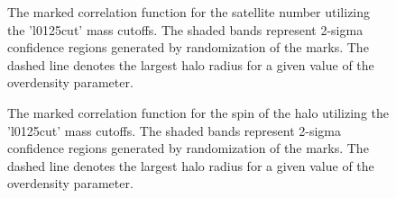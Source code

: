 \documentclass[usenatbib,usegraphicx,letterpaper]{mn2e}
\begin{document}
\begin{figure}
	\centering
	\caption{The marked correlation function for the satellite number utilizing the 'l0125cut' mass cutoffs. The shaded bands represent 2-sigma confidence regions generated by randomization of the marks. The dashed line denotes the largest halo radius for a given value of the overdensity parameter.}
\end{figure}

\begin{figure}
	\centering
	\caption{The marked correlation function for the spin of the halo utilizing the 'l0125cut' mass cutoffs. The shaded bands represent 2-sigma confidence regions generated by randomization of the marks. The dashed line denotes the largest halo radius for a given value of the overdensity parameter.}
\end{figure}
\end{document}
